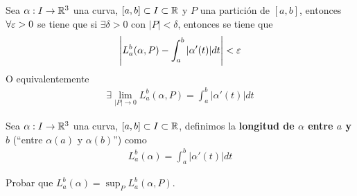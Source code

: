 \begin{prop}
    Sea $\alpha: I \to \mathbb{R}^3$ una curva, $[a,b]\subset I \subset \mathbb{R}$ y $P$ una partición de $[a,b]$, entonces $\forall \varepsilon >0$ se tiene que si $\exists \delta >0$ con $|P|<\delta$, entonces se tiene que 
    \begin{gather*}
        \left| L_a^b(\alpha, P) - \int_{a}^{b} |\alpha'(t)| dt\right| < \varepsilon
    \end{gather*}
    O equivalentemente
    \begin{gather*}
        \exists \lim_{|P|\to 0} L_a^b(\alpha, P) = \int_a^b |\alpha'(t)| dt
    \end{gather*}
\end{prop}

\begin{definicion}
    Sea $\alpha: I \to \mathbb{R}^3$ una curva, $[a,b]\subset I \subset \mathbb{R}$, definimos la \textbf{longitud de $\alpha$ entre $a$ y $b$} (``entre $\alpha(a)$ y $\alpha(b)$'') como 
    \begin{gather*}
        L_a^b(\alpha) = \int_a^b |\alpha'(t)| dt
    \end{gather*}
\end{definicion}

\begin{ejercicio}
    Probar que $L_a^b(\alpha) = \sup_P L_a^b (\alpha, P)$.
\end{ejercicio}

